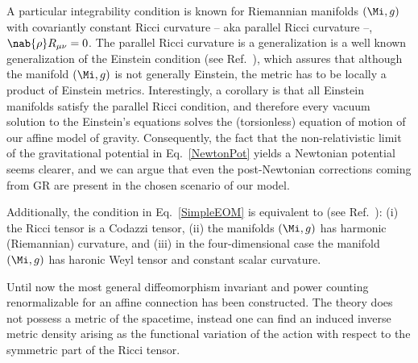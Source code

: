 \documentclass[aps,prl,twocolumn,superscriptaddress,showpacs,showkeys]{revtex4-1}
\begin{document}
A particular integrability condition is known for Riemannian manifolds $(\Mi,g)$ with covariantly constant Ricci curvature -- aka {parallel Ricci curvature} --, $\nab{\rho} R_{\mu\nu} = 0$. The parallel Ricci curvature is a generalization is a well known generalization of the Einstein condition (see Ref.~\cite{Besse,MO-Bryant}), which assures that although the manifold $(\Mi,g)$ is not generally Einstein, the metric has to be locally a product of Einstein metrics. Interestingly, a corollary is that all Einstein manifolds satisfy the parallel Ricci condition, and therefore every vacuum solution to the Einstein's equations solves the (torsionless) equation of motion of our affine model of gravity. Consequently, the fact that the non-relativistic limit of the gravitational potential in Eq.~\eqref{NewtonPot} yields a Newtonian potential seems clearer, and we can argue that even the post-Newtonian corrections coming from GR are present in the chosen scenario of our model.

Additionally, the condition in Eq.~\eqref{SimpleEOM} is equivalent to (see Ref.~\cite{Besse}): (i) the Ricci tensor is a Codazzi tensor, (ii) the manifolds $(\Mi,g)$ has harmonic (Riemannian) curvature, and (iii) in the four-dimensional case the manifold $(\Mi,g)$ has haronic Weyl tensor and constant scalar curvature.






Until now the most general diffeomorphism invariant and power counting renormalizable for an affine connection has been constructed. The theory does not possess a metric of the spacetime, instead one can find an induced inverse metric density arising as the functional variation of the action with respect to the symmetric part of the Ricci tensor.

\end{document}
